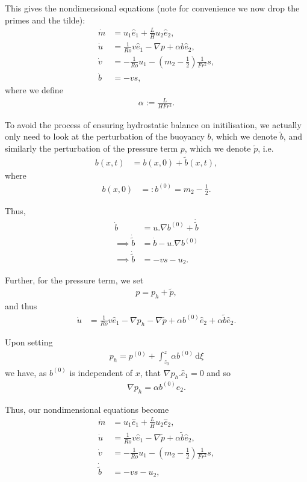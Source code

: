 \documentclass[11pt, oneside]{article}   	%
\newcommand{\eone}{\hat{e}_1}
\newcommand{\etwo}{\hat{e}_2}
\newcommand{\bt}{\tilde{b}}
\newcommand{\pt}{\tilde{p}}
\begin{document}
This gives the nondimensional equations (note for convenience we now drop the primes and the tilde):
\begin{align} 
\dot{m} &= u_1 \eone +  \frac{L}{H} u_2 \etwo, \\
\dot{u} &= \frac{1}{Ro} v \eone - \nabla p + \alpha b \etwo, \\
\dot{v} &= -\frac{1}{Ro} u_1 - (m_2 - \frac{1}{2}) \frac{1}{Fr^2} s, \\
\dot{b} &= -v s,
\end{align}
where we define
\begin{align}
\alpha := \frac{L}{H Fr^2}.
\end{align}

To avoid the process of ensuring hydrostatic balance on initilisation, we actually only need to look at the perturbation of the buoyancy \(b\), which we denote \(\bt\), and similarly the perturbation of the pressure term \(p\), which we denote \(\pt\), i.e.
\begin{align} 
b(x, t) &= b(x, 0) + \bt(x, t),
\end{align}
where
\begin{align} 
b(x, 0) &=: b^{(0)} = m_2 - \frac{1}{2}.
\end{align}

Thus,
\begin{align} 
\dot{b} &= u.\nabla b^{(0)} + \dot{\bt} \\
\implies \dot{\bt} &= \dot{b} - u.\nabla b^{(0)} \\
\implies \dot{\bt} &= -vs - u_2.
\end{align}

Further, for the pressure term, we set
\begin{align} 
p =  p_h + \pt,
\end{align}
and thus
\begin{align} 
\dot{u} &= \frac{1}{Ro} v \eone - \nabla p_h - \nabla \pt + \alpha b^{(0)} \etwo + \alpha \bt \etwo.
\end{align}

Upon setting
\begin{align} 
p_h = p^{(0)} + \int_{z_0}^z \alpha b^{(0)}\,\mathrm{d}\xi
\end{align}
we have, as \(b^{(0)}\) is independent of \(x\), that \(\nabla p_h . \eone = 0\) and so
\begin{align} 
\nabla p_h = \alpha b^{(0)} \etwo.
\end{align}

Thus, our nondimensional equations become
\begin{align} 
\dot{m} &= u_1 \eone +  \frac{L}{H} u_2 \etwo, \\
\dot{u} &= \frac{1}{Ro} v \eone - \nabla \pt + \alpha \bt \etwo, \\
\dot{v} &= -\frac{1}{Ro} u_1 - (m_2 - \frac{1}{2}) \frac{1}{Fr^2} s, \\
\dot{\bt} &= -v s - u_2,
\end{align}
\end{document}
